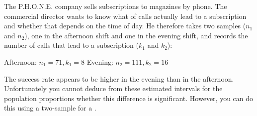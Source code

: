\setcounter{chapter}{7}
\setcounter{section}{3}
\setcounter{question}{0}



The P.H.O.N.E. company sells subscriptions to magazines by phone. The commercial director wants to know what  of calls actually lead to a subscription and whether that depends on the time of day. He therefore takes two samples ($n_1$ and $n_2$), one in the afternoon shift and one in the evening shift, and records the number of calls that lead to a subscription ($k_1$ and $k_2$):

\vspace*{0.5cm}
\begin{center}
    Afternoon: $n_1 = 71,  k_1 = 8$ \hspace{3cm} Evening: $n_2 = 111,  k_2 = 16$
\end{center}
\vspace*{0.5cm}






The success rate appears to be higher in the evening than in the afternoon. Unfortunately you cannot deduce from these estimated intervals for the population proportions whether this difference is significant. However, you can do this using a two-sample  for a . \\


